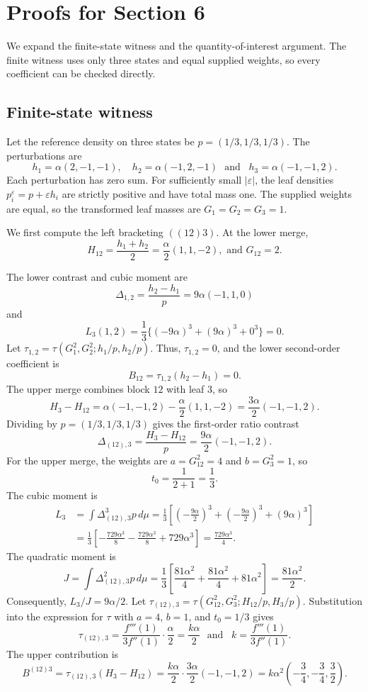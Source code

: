 \documentclass[11pt]{article}
\theoremstyle{plain}
\theoremstyle{definition}
\theoremstyle{definition}
\newcommand{\eps}{\varepsilon}
\begin{document}
\section{Proofs for Section 6}

We expand the finite-state witness and the quantity-of-interest argument. The finite witness uses only three states and equal supplied weights, so every coefficient can be checked directly.

\subsection{Finite-state witness}

Let the reference density on three states be $p=(1/3,1/3,1/3)$. The perturbations are
\[
h_1=\alpha(2,-1,-1),\quad h_2=\alpha(-1,2,-1) \,\,\,\,\text{and}\,\,\,\,\, h_3=\alpha(-1,-1,2).
\]
Each perturbation has zero sum. For sufficiently small $|\eps|$, the leaf densities $p_i^\eps=p+\eps h_i$ are strictly positive and have total mass one. The supplied weights are equal, so the transformed leaf masses are $G_1=G_2=G_3=1$.

We first compute the left bracketing $((12)3)$. At the lower merge,
\[
H_{12}=\frac{h_1+h_2}{2}=\frac{\alpha}{2}(1,1,-2),
\,\,\text{and}\,\,
G_{12}=2.
\]

The lower contrast and cubic moment are
\[
\Delta_{1,2}=\frac{h_2-h_1}{p}=9\alpha(-1,1,0)
\]
and
\[
L_3(1,2)=\frac13\{(-9\alpha)^3+(9\alpha)^3+0^3\}=0.
\]
Let $\tau_{1,2}=\tau(G_1^2,G_2^2;h_1/p,h_2/p)$. Thus, $\tau_{1,2}=0$, and the lower second-order coefficient is
\[
B_{12}=\tau_{1,2}(h_2-h_1)=0.
\]
The upper merge combines block $12$ with leaf $3$, so
\[
H_3-H_{12}=\alpha(-1,-1,2)-\frac{\alpha}{2}(1,1,-2)=\frac{3\alpha}{2}(-1,-1,2).
\]
Dividing by $p=(1/3,1/3,1/3)$ gives the first-order ratio contrast
\[
\Delta_{(12),3}=\frac{H_3-H_{12}}p=\frac{9\alpha}{2}(-1,-1,2).
\]
For the upper merge, the weights are $a=G_{12}^2=4$ and $b=G_3^2=1$, so
\[
t_0=\frac{1}{2+1}=\frac13.
\]
The cubic moment is
\[
\begin{aligned}
L_3&=\int \Delta_{(12),3}^3p\,d\mu
=\frac13\left[\left(-\frac{9\alpha}{2}\right)^3+
\left(-\frac{9\alpha}{2}\right)^3+(9\alpha)^3\right]\\
&=\frac13\left[-\frac{729\alpha^3}{8}-\frac{729\alpha^3}{8}+729\alpha^3\right]
=\frac{729\alpha^3}{4}.
\end{aligned}
\]
The quadratic moment is
\[
J=\int \Delta_{(12),3}^2p\,d\mu
=\frac13\left[\frac{81\alpha^2}{4}+\frac{81\alpha^2}{4}+81\alpha^2\right]
=\frac{81\alpha^2}{2}.
\]
Consequently, $L_3/J=9\alpha/2$. Let $\tau_{(12),3}=\tau(G_{12}^2,G_3^2;H_{12}/p,H_3/p)$. Substitution into the expression for $\tau$ with $a=4$, $b=1$, and $t_0=1/3$ gives
\[
\tau_{(12),3}
=\frac{f'''(1)}{3f''(1)}\cdot\frac{\alpha}{2}=\frac{k\alpha}{2}
\,\,\,\,\text{and}\,\,\,\,\,
k=\frac{f'''(1)}{3f''(1)}.
\]
The upper contribution is
\[
B^{(12)3}=\tau_{(12),3}(H_3-H_{12})
=\frac{k\alpha}{2}\cdot\frac{3\alpha}{2}(-1,-1,2)
=k\alpha^2\left(-\frac34,-\frac34,\frac32\right).
\]
\end{document}

